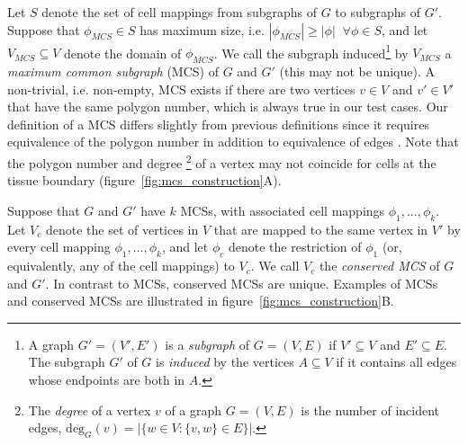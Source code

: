 \documentclass[a4paper,11pt]{article}
\begin{document}
Let $S$ denote the set of cell mappings from subgraphs of $G$ to subgraphs of $G'$. Suppose that $\phi_{MCS} \in S$ has maximum size, i.e. $| \phi_{MCS} | \geq | \phi | \;\; \forall \phi \in S$, and let $V_{MCS} \subseteq V$ denote the domain of $\phi_{MCS}$. 
We call the subgraph induced\footnote{A graph $G' = (V', E')$ is a \textit{subgraph} of $G = (V, E)$ if $V' \subseteq V$ and $E' \subseteq E$. The subgraph $G'$ of $G$ is \textit{induced} by the vertices $A \subseteq V$ if it contains all edges whose endpoints are both in $A$.} by $V_{MCS}$ a \textit{maximum common subgraph} (MCS) of $G$ and $G'$ (this may not be unique).
%
%
A non-trivial, i.e. non-empty, MCS exists if there are two vertices $v \in V$ and $v' \in V'$ that have the same polygon number, which is always true in our test cases.
%
%
%
Our definition of a MCS differs slightly from previous definitions since it requires equivalence of the polygon number in addition to equivalence of edges \cite{Ullmann1976, Raymond2002}. 
Note that the polygon number and degree%
\footnote{The \textit{degree} of a vertex $v$ of a graph $G = (V,E)$ is the number of incident edges, $\mathrm{deg}_{G}(v) = | \{ w \in V : \{v, w \} \in E \} |$.} %
of a vertex may not coincide for cells at the tissue boundary (figure~\ref{fig:mcs_construction}A). 

Suppose that $G$ and $G'$ have $k$ MCSs, with associated cell mappings $\phi_{1}, \ldots, \phi_{k}$. 
Let $V_{c}$ denote the set of vertices in $V$ that are mapped to the same vertex in $V'$ by every cell mapping $\phi_{1}, \ldots, \phi_{k}$, and let $\phi_{c}$ denote the restriction of $\phi_{1}$ (or, equivalently, any of the cell mappings) to $V_{c}$. 
We call $V_{c}$ the \textit{conserved MCS} of $G$ and $G'$. 
%
%
%
In contrast to MCSs, conserved MCSs are unique. Examples of MCSs and conserved MCSs are illustrated in figure~\ref{fig:mcs_construction}B.
\end{document}
